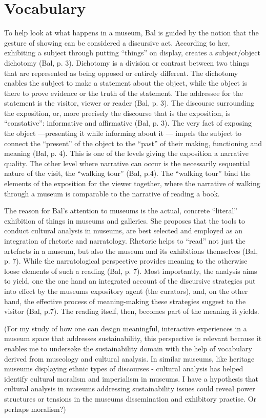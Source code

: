 \section{Vocabulary}
To help look at what happens in a museum, Bal is guided by the notion that the gesture of showing can be considered a discursive act. According to her, exhibiting a subject through putting “things” on display, creates a subject/object dichotomy (Bal, p. 3). Dichotomy is a division or contrast between two things that are represented as being opposed or entirely different. The dichotomy enables the subject to make a statement about the object, while the object is there to prove evidence or the truth of the statement. The addressee for the statement is the visitor, viewer or reader (Bal, p. 3). The discourse surrounding the exposition, or, more precisely the discourse that is the exposition, is “constative”: informative and affirmative (Bal, p. 3). The very fact of exposing the object —presenting it while informing about it — impels the subject to connect the “present” of the object to the “past” of their making, functioning and meaning (Bal, p. 4). This is one of the levels giving the exposition a narrative quality. The other level where narrative can occur is the necessarily sequential nature of the visit, the “walking tour” (Bal, p.4). The “walking tour” bind the elements of the exposition for the viewer together, where the narrative of walking through a museum is comparable to the narrative of reading a book.

The reason for Bal’s attention to museums is the actual, concrete “literal” exhibition of things in museums and galleries. She proposes that the tools to conduct cultural analysis in museums, are best selected and employed as an integration of rhetoric and narratology. Rhetoric helps to “read” not just the artefacts in a museum, but also the museum and its exhibitions themselves (Bal, p. 7). While the narratological perspective provides meaning to the otherwise loose elements of such a reading (Bal, p. 7). Most importantly, the analysis aims to yield, one the one hand an integrated account of the discursive strategies put into effect by the museums expository agent (the curators), and, on the other hand, the effective process of meaning-making these strategies suggest to the visitor (Bal, p.7). The reading itself, then, becomes part of the meaning it yields.

(For my study of how one can design meaningful, interactive experiences in a museum space that addresses sustainability, this perspective is relevant because it enables me to undersøke the sustainability domain with the help of vocabulary derived from museology and cultural analysis. In similar museums, like heritage museums displaying ethnic types of discourses - cultural analysis has helped identify cultural moralism and imperialism in museums. I have a hypothesis that cultural analysis in museums addressing sustainability issues could reveal power structures or tensions in the museums dissemination and exhibitory practise. Or perhaps moralism?)

